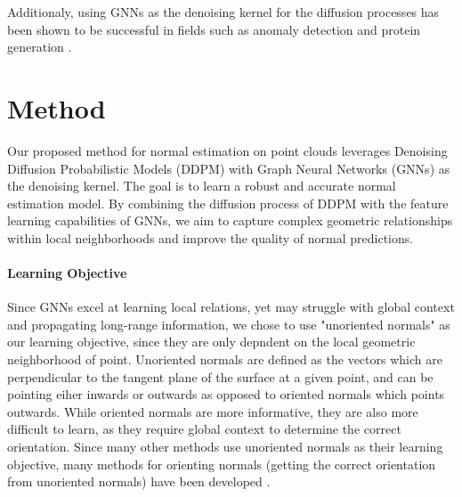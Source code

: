 \documentclass{acmart}
\newcommand{\instructions}[1]{\textcolor{red}{#1}\newline}
\renewcommand{\instructions}[1]{}    %
\begin{document}
Additionaly, using GNNs as the denoising kernel for the diffusion processes has been shown to be successful in fields such as anomaly detection \cite{ConGNN_2024} and protein generation \cite{ingraham2023illuminating}.

\section{Method}
\instructions{Begin in giving intuition to the solution you are proposing, then formally detail the method/approach you are suggesting -  1 page}
Our proposed method for normal estimation on point clouds leverages Denoising Diffusion Probabilistic Models (DDPM) with Graph Neural Networks (GNNs) as the denoising kernel. The goal is to learn a robust and accurate normal estimation model. By combining the diffusion process of DDPM with the feature learning capabilities of GNNs, we aim to capture complex geometric relationships within local neighborhoods and improve the quality of normal predictions.

\paragraph{Learning Objective}
Since GNNs excel at learning local relations, yet may struggle with global context and propagating long-range information, we chose to use "unoriented normals" as our learning objective, since they are only depndent on the local geometric neighborhood of point. Unoriented normals are defined as the vectors which are perpendicular to the tangent plane of the surface at a given point, and can be pointing eiher inwards or outwards as opposed to oriented normals which points outwards. While oriented normals are more informative, they are also more difficult to learn, as they require global context to determine the correct orientation. Since many other methods use unoriented normals as their learning objective, many methods for orienting normals (getting the correct orientation from unoriented normals) have been developed \cite{xu2023globally,gotsman2024linear}.
\end{document}
